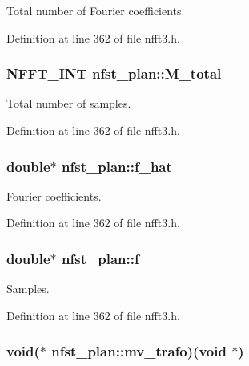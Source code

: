 Total number of Fourier coefficients. 



Definition at line 362 of file nfft3.\-h.

\hypertarget{structnfst__plan_a9f8c705a3bc1a03ac8eca2d945d6b32a}{
\subsubsection[{M\-\_\-total}]{\setlength{\rightskip}{0pt plus 5cm}N\-F\-F\-T\-\_\-\-I\-N\-T nfst\-\_\-plan\-::\-M\-\_\-total}}\label{structnfst__plan_a9f8c705a3bc1a03ac8eca2d945d6b32a}


Total number of samples. 



Definition at line 362 of file nfft3.\-h.

\hypertarget{structnfst__plan_a8e7ed6ed137f58dea8f3871d959f8d9c}{
\subsubsection[{f\-\_\-hat}]{\setlength{\rightskip}{0pt plus 5cm}double$\ast$ nfst\-\_\-plan\-::f\-\_\-hat}}\label{structnfst__plan_a8e7ed6ed137f58dea8f3871d959f8d9c}


Fourier coefficients. 



Definition at line 362 of file nfft3.\-h.

\hypertarget{structnfst__plan_a314e2d828775d6aa93a26d7c40b7b931}{
\subsubsection[{f}]{\setlength{\rightskip}{0pt plus 5cm}double$\ast$ nfst\-\_\-plan\-::f}}\label{structnfst__plan_a314e2d828775d6aa93a26d7c40b7b931}


Samples. 



Definition at line 362 of file nfft3.\-h.

\hypertarget{structnfst__plan_a4a3b2ecc26204b3087d1c19b7857943f}{
\subsubsection[{mv\-\_\-trafo}]{\setlength{\rightskip}{0pt plus 5cm}void($\ast$ nfst\-\_\-plan\-::mv\-\_\-trafo)(void $\ast$)}}\label{structnfst__plan_a4a3b2ecc26204b3087d1c19b7857943f}


